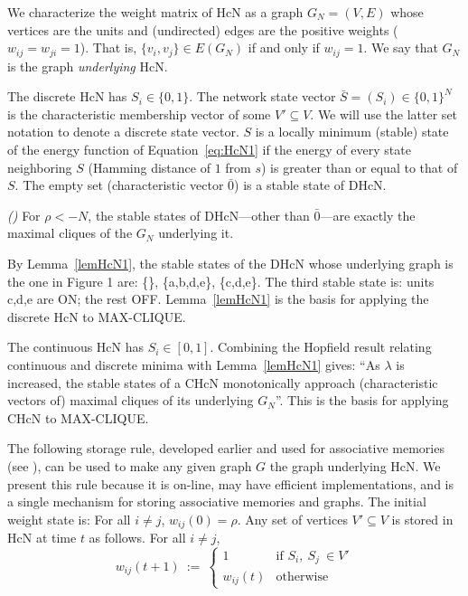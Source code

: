 We characterize
the weight matrix of 
HcN as a graph $G_N=(V,E)$ whose vertices are the units and (undirected) edges
are the positive weights ($w_{ij} = w_{ji} = 1$). That is, $\{v_i,v_j\} \in E(G_N)$ if and 
only if $w_{ij} = 1$. We say that $G_N$ is the graph {\em underlying} HcN. \par
\par
The discrete HcN has $S_i \in \{0,1\}$.
The network state vector $\bar{S} = (S_i) \in \{0,1\}^N$
is the characteristic membership vector of some $V' \subseteq V$. 
We will use the latter set notation to denote a discrete state vector.
$S$ is a locally
minimum (stable) state of the energy function of Equation~\ref{eq:HcN1} 
if the energy of every state neighboring 
$S$ (Hamming distance of $1$ from $s$) is greater than or equal to that of $S$. 
The empty set (characteristic vector $\bar{0}$) is a stable state of DHcN. 
\begin{lemma}
\label{lemHcN1}
{\em (\cite{kn:tr9002,kn:Jag91})}
For $\rho < -N$, the stable states of DHcN---other than
$\bar{0}$---are
exactly the maximal cliques of the $G_N$ underlying it.
\end{lemma}
By Lemma~\ref{lemHcN1}, the stable states of the DHcN whose underlying
graph is the one in Figure 1 are: \{\}, \{a,b,d,e\}, \{c,d,e\}.
The third stable state is: units c,d,e are ON; the rest OFF.
Lemma~\ref{lemHcN1} is the basis for applying the discrete HcN to 
MAX-CLIQUE.
\par
The continuous HcN has $S_i \in [0,1]$. Combining the Hopfield 
result relating continuous and discrete minima with 
Lemma~\ref{lemHcN1} gives:
``As $\lambda$ is increased, the stable states of a CHcN
monotonically approach (characteristic vectors of) maximal cliques
of its underlying $G_N$''.
This is the basis for applying CHcN to MAX-CLIQUE.
\par
The following storage rule, developed earlier and used 
for associative memories (see \cite{kn:tr9002,kn:Jag91}),
can be used to make any given graph $G$ the graph underlying HcN.
We present 
this rule because it is on-line, may have efficient implementations, 
and is a single mechanism for storing associative memories and graphs.
The initial weight state is: For all $i \neq j$,
$w_{ij}(0)  =  \rho$.
Any set of vertices $V' \subseteq V$ is stored in HcN at time $t$ as follows. For all $i \neq j$,
\begin{equation}
w_{ij}(t+1)~:=~
\left\{
\begin{array}{rl}
1 & \mbox{if $S_i,~S_j~\in V'$} \\
w_{ij}(t) & \mbox{otherwise}
\end{array}
\right.
\end{equation}

